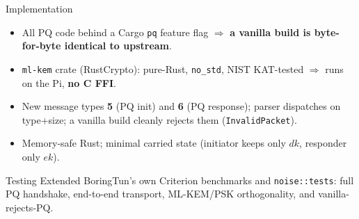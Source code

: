 \documentclass[aspectratio=169,11pt]{beamer}
\begin{document}
\begin{frame}{Implementation}
  \begin{itemize}
    \item All PQ code behind a Cargo \texttt{pq} feature flag $\Rightarrow$
          \textbf{a vanilla build is byte-for-byte identical to upstream}.
    \item \texttt{ml-kem} crate (RustCrypto): pure-Rust, \texttt{no\_std},
          NIST KAT-tested $\Rightarrow$ runs on the Pi, \textbf{no C FFI}.
    \item New message types \textbf{5} (PQ init) and \textbf{6} (PQ response);
          parser dispatches on type+size; a vanilla build cleanly rejects them
          (\texttt{InvalidPacket}).
    \item Memory-safe Rust; minimal carried state (initiator keeps only $dk$,
          responder only $ek$).
  \end{itemize}
  \vfill
  \begin{block}{Testing}
    Extended BoringTun's own Criterion benchmarks and \texttt{noise::tests}:
    full PQ handshake, end-to-end transport, ML-KEM/PSK orthogonality, and
    vanilla-rejects-PQ.
  \end{block}
\end{frame}
\end{document}
